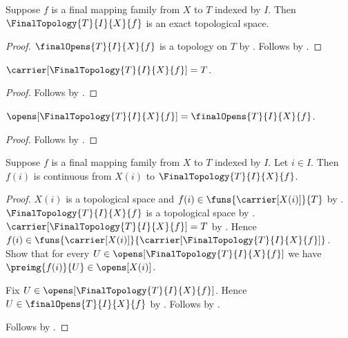 \begin{theorem}\label{final_topology_is_exact}
    Suppose $f$ is a final mapping family from $X$ to $T$ indexed by $I$.
    Then $\FinalTopology{T}{I}{X}{f}$ is an exact topological space.
\end{theorem}
\begin{proof}
    $\finalOpens{T}{I}{X}{f}$ is a topology on $T$ by
        .
    Follows by
        .
\end{proof}

\begin{proposition}\label{final_topology_carrier}
    $\carrier[\FinalTopology{T}{I}{X}{f}]=T$.
\end{proposition}
\begin{proof}
    Follows by .
\end{proof}

\begin{proposition}\label{final_topology_opens}
    $\opens[\FinalTopology{T}{I}{X}{f}]=\finalOpens{T}{I}{X}{f}$.
\end{proposition}
\begin{proof}
    Follows by .
\end{proof}

\begin{theorem}\label{final_topology_structure_map_continuous}
    Suppose $f$ is a final mapping family from $X$ to $T$ indexed by $I$.
    Let $i\in I$.
    Then $f(i)$ is continuous from $X(i)$ to
        $\FinalTopology{T}{I}{X}{f}$.
\end{theorem}
\begin{proof}
    $X(i)$ is a topological space and
        $f(i)\in\funs{\carrier[X(i)]}{T}$ by
        .
    $\FinalTopology{T}{I}{X}{f}$ is a topological space by
        .
    $\carrier[\FinalTopology{T}{I}{X}{f}]=T$ by
        .
    Hence $f(i)\in
        \funs{\carrier[X(i)]}{\carrier[\FinalTopology{T}{I}{X}{f}]}$.
    Show that for every $U\in\opens[\FinalTopology{T}{I}{X}{f}]$ we have
        $\preimg{f(i)}{U}\in\opens[X(i)]$.
    \begin{subproof}
        Fix $U\in\opens[\FinalTopology{T}{I}{X}{f}]$.
        Hence $U\in\finalOpens{T}{I}{X}{f}$ by
            .
        Follows by .
    \end{subproof}
    Follows by .
\end{proof}

